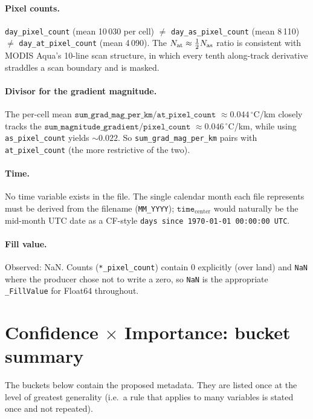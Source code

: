 \documentclass[11pt]{article}
\begin{document}
\paragraph{Pixel counts.} \texttt{day\_pixel\_count} (mean 10\,030
per cell) $\neq$ \texttt{day\_as\_pixel\_count} (mean 8\,110)
$\neq$ \texttt{day\_at\_pixel\_count} (mean 4\,090). The
$N_{\rm at} \approx \frac{1}{2}N_{\rm as}$ ratio is consistent with
MODIS Aqua's 10-line scan structure, in which every tenth
along-track derivative straddles a scan boundary and is masked.

\paragraph{Divisor for the gradient magnitude.} The per-cell mean
$\mathtt{sum\_grad\_mag\_per\_km}/\mathtt{at\_pixel\_count}$
$\approx 0.044\,^\circ$C/km closely tracks the
$\mathtt{sum\_magnitude\_gradient}/\mathtt{pixel\_count}$
$\approx 0.046\,^\circ$C/km, while using \texttt{as\_pixel\_count}
yields $\sim 0.022$. So
\texttt{sum\_grad\_mag\_per\_km} pairs with
\texttt{at\_pixel\_count} (the more restrictive of the two).

\paragraph{Time.} No time variable exists in the file. The single
calendar month each file represents must be derived from the
filename (\texttt{MM\_YYYY}); $\texttt{time}_\text{center}$ would
naturally be the mid-month UTC date as a CF-style
\texttt{days since 1970-01-01 00:00:00 UTC}.

\paragraph{Fill value.} Observed: NaN. Counts (\texttt{*\_pixel\_count})
contain $0$ explicitly (over land) and \texttt{NaN} where the
producer chose not to write a zero, so \texttt{NaN} is the
appropriate \texttt{\_FillValue} for Float64 throughout.

\section{Confidence $\times$ Importance: bucket summary}

The buckets below contain the proposed metadata. They are listed
once at the level of greatest generality (i.e.\ a rule that
applies to many variables is stated once and not repeated).
\end{document}

